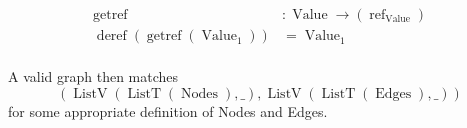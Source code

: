 \documentclass{article}
\DeclareMathOperator{\ListT}{ListT}
\DeclareMathOperator{\Value}{Value}
\DeclareMathOperator{\ListV}{ListV}
\DeclareMathOperator{\textref}{ref}
\newcommand{\ValueRef}{(\textref_{\Value})}
\begin{document}
\begin{align*}
    \operatorname{getref} &: \Value \rightarrow \ValueRef \\
    \operatorname{deref}(\operatorname{getref}(\Value_1)) &= \Value_1 \\
\end{align*}

A valid graph then matches 
\[(\ListV(\ListT(\operatorname{Nodes}), \_), \ListV(\ListT(\operatorname{Edges}), \_))\]
for some appropriate definition of Nodes and Edges.
\end{document}
